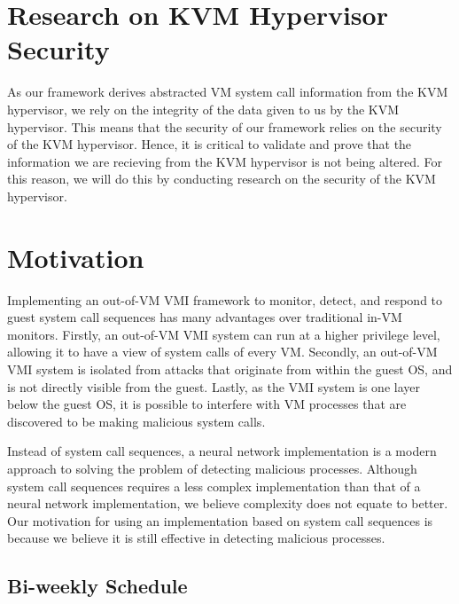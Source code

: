 \documentclass{article}
\begin{document}
\begin{flushleft}
\begin{spacing}{1.5}
\section*{\Large Research on KVM Hypervisor Security}

{\large As our framework derives abstracted VM system call information from the KVM hypervisor, we rely on the integrity of the data given to us by the KVM hypervisor. This means that the security of our framework relies on the security of the KVM hypervisor. Hence, it is critical to validate and prove that the information we are recieving from the KVM hypervisor is not being altered. For this reason, we will do this by conducting research on the security of the KVM hypervisor.}

\section*{\huge Motivation}

{\large Implementing an out-of-VM VMI framework to monitor, detect, and respond to guest system call sequences has many advantages over traditional in-VM monitors. Firstly, an out-of-VM VMI system can run at a higher privilege level, allowing it to have a view of system calls of every VM. Secondly, an out-of-VM VMI system is isolated from attacks that originate from within the guest OS, and is not directly visible from the guest. Lastly, as the VMI system is one layer below the guest OS, it is possible to interfere with VM processes that are discovered to be making malicious system calls. \newline}

{\large Instead of system call sequences, a neural network implementation is a modern approach to solving the problem of detecting malicious processes. Although system call sequences requires a less complex implementation than that of a neural network implementation, we believe complexity does not equate to better. Our motivation for using an implementation based on system call sequences is because we believe it is still effective in detecting malicious processes.}

\subsection*{\huge Bi-weekly Schedule}


\end{spacing}
\end{flushleft}
\end{document}
